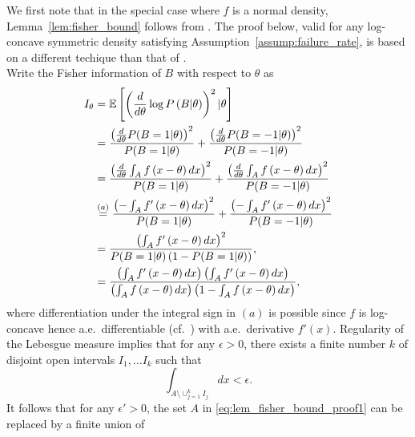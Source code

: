 \begin{proof-of-lemma}[\ref{lem:fisher_bound}]  
  We first note that in the special case where $f$ is a normal density, Lemma~\ref{lem:fisher_bound} follows from \cite[Thm.~3]{Barnes2018}. The proof below, valid for any log-concave symmetric density satisfying Assumption~\ref{assump:failure_rate}, is based on a different techique than that of \cite{Barnes2018}. \\

  Write the Fisher information of $B$ with respect to $\theta$ as
  \begin{align}
    I_\theta & =  \mathbb{E}\left[  \left( \frac{d}{d\theta} \log P\left( B | \theta \right) \right)^2 |\theta \right] \nonumber \\
    & = \frac{ \left(\frac{d}{d\theta} P(B=1|\theta) \right)^2}{P(B=1| \theta)} + \frac{ \left(\frac{d}{d\theta} P(B=-1|\theta) \right)^2} {P(B=-1| \theta)} \nonumber \\
    & =  \frac{ \left( \frac{d}{d\theta} \int_A f \left( x-\theta\right)dx \right)^2} { P(B=1| \theta) } + \frac{ \left( \frac{d}{d\theta}\int_A f \left( x-\theta \right)dx \right)^2} { P(B=-1| \theta) } \nonumber \\ 
    & \overset{(a)}{=} \frac{ \left( - \int_A f' \left( x-\theta \right)dx \right)^2} { P(B=1| \theta) } + \frac{ \left(- \int_A f' \left( x-\theta \right)dx \right)^2} { P(B=-1| \theta) } \nonumber \\ 
    & = \frac{\left( \int_A f'\left( x-\theta \right) dx \right)^2 }{  P(B=1 | \theta) \left(1-P(B=1|\theta) \right)  }, \nonumber \\
    & = \frac{\left( \int_A f'\left( x-\theta \right) dx \right) \left( \int_A f'\left( x-\theta \right) dx \right)}{ \left( \int_A f \left( x-\theta \right) dx \right)  \left(1- \int_A f \left( x-\theta \right) dx \right) }, \label{eq:lem_fisher_bound_proof1}
  \end{align}
  where differentiation under the integral sign in $(a)$ is possible since
  $f$ is log-concave hence a.e.\ differentiable
  (cf.~\cite{Bertsekas73}) with a.e.\ derivative $f'(x)$. Regularity of
  the Lebesgue measure implies that for any $\epsilon>0$, there exists a
  finite number $k$ of disjoint open intervals $I_1,\ldots I_k$ such that
  \begin{equation*}
    \int_{A\setminus \cup_{j=1}^k I_j }  dx < \epsilon.
  \end{equation*}
  It follows that for any $\epsilon' > 0$, the set $A$ in
  \eqref{eq:lem_fisher_bound_proof1} can be replaced by a finite union of

\end{proof-of-lemma}
